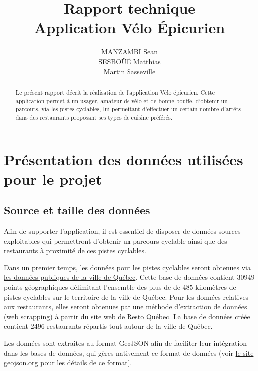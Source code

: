 \documentclass[12pt]{article}
\begin{document}
\title{Rapport technique \\ Application Vélo Épicurien}
\author{MANZAMBI Sean \\ SESBOÜÉ Matthias \\ Martin Sasseville}

\maketitle

\begin{abstract}
    Le présent rapport décrit la réalisation de l'application Vélo épicurien. Cette application permet à un usager, amateur de vélo et de bonne bouffe, d'obtenir un parcours, via les pistes cyclables, lui permettant d'effectuer un certain nombre d'arrêts dans des restaurants proposant ses types de cuisine préférés.
\end{abstract}

\section{Présentation des données utilisées pour le projet}

\subsection{Source et taille des données}

    Afin de supporter l'application, il est essentiel de disposer de données sources exploitables qui permettront d'obtenir un parcours cyclable ainsi que des restaurants à proximité de ces pistes cyclables. 
    
    Dans un premier temps, les données pour les pistes cyclables seront obtenues via \href{https://www.donneesquebec.ca/recherche/fr/dataset/vque_24}{les données publiques de la ville de Québec}. Cette base de données contient $30949$ points géographiques délimitant l'ensemble des plus de de $485$ kilomètres de pistes cyclables sur le territoire de la ville de Québec. Pour les données relatives aux restaurants, elles seront obtenues par une méthode d'extraction de données (web scrapping) à partir du \href{https://www.restoquebec.ca/}{site web de Resto Québec}. La base de données créée contient $2496$ restaurants répartis tout autour de la ville de Québec.

    Les données sont extraites au format GeoJSON afin de faciliter leur intégration dans les bases de données, qui gères nativement ce format de données (voir \href{https://geojson.org/}{le site geojson.org} pour les détails de ce format).
\end{document}
